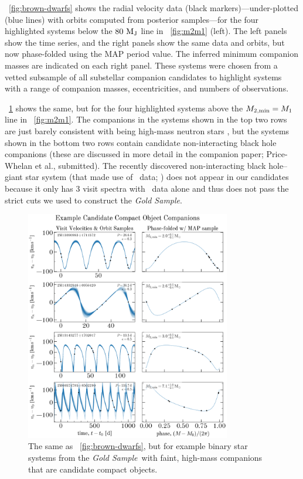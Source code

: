 \documentclass[modern]{aastex63}
\newcommand{\goldsample}{\textit{Gold Sample}}
\begin{document}
\figurename~\ref{fig:brown-dwarfs} shows the radial velocity data (black
markers)---under-plotted (blue lines) with orbits computed from posterior
samples---for the four highlighted systems below the $80~\mathrm{M}_{\mathrm{J}}$ line in
\figurename~\ref{fig:m2m1} (left).
The left panels show the time series, and the right panels show the same data
and orbits, but now phase-folded using the MAP period value.
The inferred minimum companion masses are indicated on each right panel.
These systems were chosen from a vetted subsample of all substellar companion
candidates to highlight systems with a range of companion masses,
eccentricities, and numbers of observations.

\figurename~\ref{fig:compact-objects} shows the same, but for the four
highlighted systems above the $M_{2, {\rm min}} = M_1$ line in
\figurename~\ref{fig:m2m1}.
The companions in the systems shown in the top two rows are just barely
consistent with being high-mass neutron stars \citep[e.g.,][]{Cromartie:2019},
but the systems shown in the bottom two rows contain candidate non-interacting
black hole companions (these are discussed in more detail in the companion
paper; Price-Whelan et al., submitted).
The recently discovered non-interacting black hole--giant star system (that made
use of \apogee\ data; \citealt{Thompson:2019}) does not appear in our candidates
because it only has 3 visit spectra with \apogee\ data alone and thus does not
pass the strict cuts we used to construct the \goldsample.

\begin{figure}[!t]
    \begin{center}
    \includegraphics[width=0.8\textwidth]{example-compact-objects-placeholder.png}
    \end{center}
    \caption{%
    The same as \figurename~\ref{fig:brown-dwarfs}, but for example binary star
    systems from the \goldsample\ with faint, high-mass companions that are
    candidate compact objects.
    \label{fig:compact-objects}
    }
\end{figure}
\end{document}
